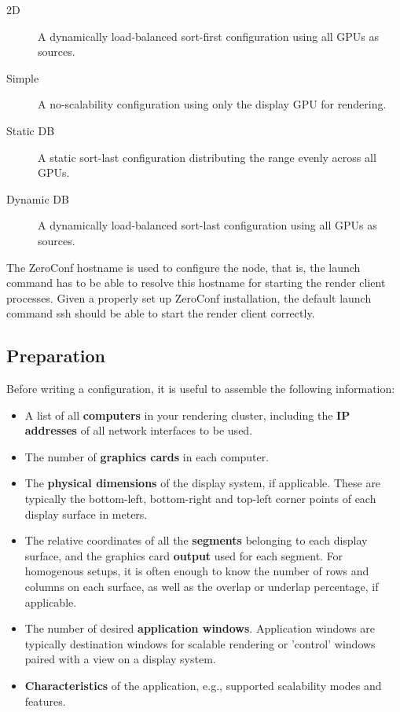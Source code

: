 \documentclass[10pt,a4]{scrartcl}
\begin{document}
\begin{description}
\item [2D] A dynamically load-balanced sort-first configuration using all GPUs
  as sources.
\item [Simple] A no-scalability configuration using only the display GPU for
  rendering.
\item [Static DB] A static sort-last configuration distributing the range evenly
  across all GPUs.
\item [Dynamic DB] A dynamically load-balanced sort-last configuration using all
  GPUs as sources.
\end{description}

The ZeroConf hostname is used to configure the node, that is, the launch command
has to be able to resolve this hostname for starting the render client
processes. Given a properly set up ZeroConf installation, the default launch
command \textsf{ssh} should be able to start the render client correctly.

\subsection{Preparation}

Before writing a configuration, it is useful to assemble the following
information:

\begin{itemize}
\item A list of all \textbf{computers} in your rendering cluster,
  including the \textbf{IP addresses} of all network interfaces to be
  used.
\item The number of \textbf{graphics cards} in each computer.
\item The \textbf{physical dimensions} of the display system, if
  applicable. These are typically the bottom-left, bottom-right and
  top-left corner points of each display surface in meters.
\item The relative coordinates of all the \textbf{segments} belonging to
  each display surface, and the graphics card \textbf{output} used for
  each segment. For homogenous setups, it is often enough to know the
  number of rows and columns on each surface, as well as the overlap or
  underlap percentage, if applicable.
\item The number of desired \textbf{application windows}. Application
  windows are typically destination windows for scalable rendering or
  'control' windows paired with a view on a display system.
\item \textbf{Characteristics} of the application, e.g., supported
  scalability modes and features.
\end{itemize}
\end{document}
